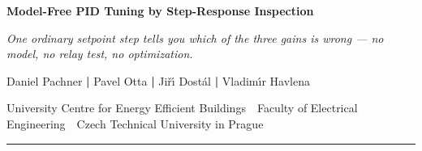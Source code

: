 \documentclass[final]{article}
\renewcommand{\small}       {\fontsize{29}{36}\selectfont}
\renewcommand{\large}       {\fontsize{34}{41}\selectfont}
\renewcommand{\Large}       {\fontsize{40}{48}\selectfont}
\newcommand{\sffam}{\fontfamily{phv}\selectfont}
\newcommand{\titlesize}{\fontsize{84}{95}\selectfont}
\begin{document}
\noindent
\makebox[0pt][l]{\raisebox{-20mm}{%
}}%
\begin{minipage}[c]{\textwidth}
\begin{center}
{\sffam\bfseries\titlesize Model-Free PID Tuning by Step-Response Inspection}

\vspace{4mm}
{\large\itshape One ordinary setpoint step tells you \emph{which} of the
three gains is wrong --- no model, no relay test, no optimization.}


\vspace{5mm}
{\Large Daniel Pachner \quad\textcolor{rule}{\textbf{|}}\quad
 Pavel Otta \quad\textcolor{rule}{\textbf{|}}\quad
 Ji\v{r}\'{\i} Dost\'al \quad\textcolor{rule}{\textbf{|}}\quad
 Vladim\'{\i}r Havlena}

\vspace{3mm}
{\small\color{muted} University Centre for Energy Efficient Buildings
 \,\textperiodcentered\, Faculty of Electrical Engineering
 \,\textperiodcentered\, Czech Technical University in Prague}
\end{center}
\end{minipage}%
\makebox[0pt][r]{\raisebox{-20mm}{%
}}

\vspace{3mm}
{\color{navy}\rule{\textwidth}{2.5pt}}
\vspace{3mm}
\end{document}
